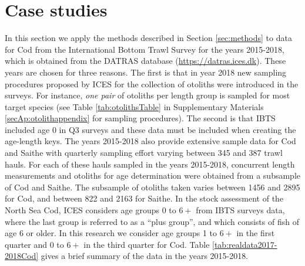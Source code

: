 \documentclass[a4paper 12pt]{article}
\numberwithin{equation}{section}
\begin{document}
\section{Case studies}
\label{sec:data}
In this section we apply the methods described in Section \ref{sec:methods} to data for Cod from the International Bottom Trawl Survey for the years 2015-2018, which is obtained from the DATRAS database (\href{https://datras.ices.dk}{https://datras.ices.dk}). These years are chosen for three reasons. The first is that in year 2018 new sampling procedures proposed by ICES for the collection of otoliths were introduced in the surveys. For instance, \textit{one pair} of otoliths per length group is sampled for most target species (see Table \ref{tab:otolithsTable} in Supplementary Materials \ref{secAp:otolithappendix} for sampling procedures). The second is that IBTS included age 0 in Q3 surveys and these data must be included when creating the age-length keys. The years 2015-2018 also provide extensive sample data for Cod and Saithe with quarterly sampling effort varying between 345 and 387 trawl hauls.  For each of these hauls sampled in the years 2015-2018, concurrent length measurements and otoliths for age determination were obtained from a subsample of Cod and Saithe. The subsample of otoliths taken varies between 1456 and 2895 for Cod, and between 822 and 2163 for Saithe.  In the stock assessment of the North Sea Cod,  ICES considers age groups 0 to $6+$ from IBTS surveys data, where the last group is referred to as a ``plus group'', and which consists of fish of age 6 or older.  In this research we consider age groups 1 to $6+$ in the first quarter and 0 to $6+$ in the third quarter for Cod. Table \ref{tab:realdata2017-2018Cod}  gives a brief summary of the data in the years 2015-2018.\\
\end{document}
